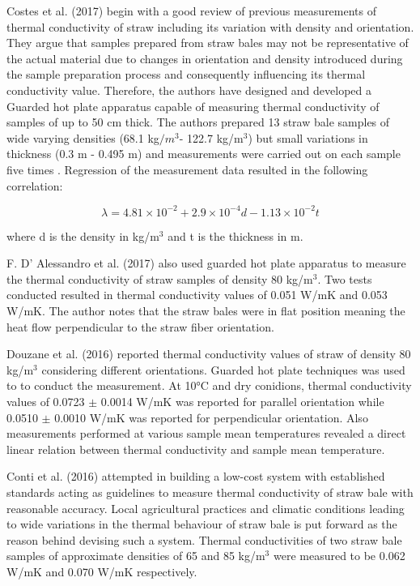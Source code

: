 \documentclass[12pt]{report}
\begin{document}
 Costes et al. (2017) begin with a good review of previous measurements
of thermal conductivity of straw including its variation with density
and orientation. They argue that samples prepared from straw bales may
not be representative of the actual material due to changes in
orientation and density introduced during the sample preparation process
and consequently influencing its thermal conductivity value. Therefore,
the authors have designed and developed a Guarded hot plate apparatus
capable of measuring thermal conductivity of samples of up to 50 cm
thick. The authors prepared 13 straw bale samples of wide varying
densities (68.1 kg\(/m^{3}\)- 122.7 kg/m\(^{3}\)) but small variations
in thickness (0.3 m - 0.495 m) and measurements were carried out on each
sample five times . Regression of the measurement data resulted in the
following correlation:

\[\lambda = 4.81 \times 10^{-2} + 2.9 \times 10^{-4} d   -1.13 \times 10^{-2} t\]

where d is the density in kg/m\(^{3}\) and t is the thickness in m.

 F. D' Alessandro et al. (2017) also used guarded hot plate apparatus to
measure the thermal conductivity of straw samples of density 80
kg/m\(^{3}\). Two tests conducted resulted in thermal conductivity
values of 0.051 W/mK and 0.053 W/mK. The author notes that the straw
bales were in flat position meaning the heat flow perpendicular to the
straw fiber orientation.

 Douzane et al. (2016) reported thermal conductivity values of straw of
density 80 kg/m\(^{3}\) considering different orientations. Guarded hot
plate techniques was used to to conduct the measurement. At 10°C and dry
conidions, thermal conductivity values of 0.0723 \(\pm\) 0.0014 W/mK was
reported for parallel orientation while 0.0510 \(\pm\) 0.0010 W/mK was
reported for perpendicular orientation. Also measurements performed at
various sample mean temperatures revealed a direct linear relation
between thermal conductivity and sample mean temperature. 

 Conti et al. (2016) attempted in building a low-cost system with
established standards acting as guidelines to measure thermal
conductivity of straw bale with reasonable accuracy. Local agricultural
practices and climatic conditions leading to wide variations in the
thermal behaviour of straw bale is put forward as the reason behind
devising such a system. Thermal conductivities of two straw bale samples
of approximate densities of 65 and 85 kg/m\(^{3}\) were measured to be
0.062 W/mK and 0.070 W/mK respectively.
\end{document}
